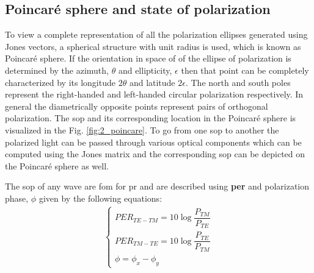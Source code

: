 \documentclass[../report.tex]{subfiles}
\begin{document}
		\subsection{Poincaré sphere and state of polarization} \label{concept:poincare_sphare}
To view a complete representation of all the polarization ellipses generated using Jones vectors, a spherical structure with unit radius is used, which is known as Poincaré sphere. If the orientation in space of of the ellipse of polarization is determined by the azimuth, $\theta$ and ellipticity, $\epsilon$ then that point can be completely characterized by its longitude $2\theta$ and latitude $2\epsilon$. The north and south poles represent the right-handed and left-handed circular polarization respectively. In general the diametrically opposite points represent pairs of orthogonal polarization. The \gls{sop} and its corresponding location in the Poincaré sphere is visualized in the Fig. \ref{fig:2_poincare}. To go from one \gls{sop} to another the polarized light can be passed through various optical components which can be computed using the Jones matrix and the corresponding \gls{sop} can be depicted on the Poincaré sphere as well. 
\par The \gls{sop} of any wave are \gls{fom} for \gls{pr} and are described using \textbf{\gls{per}} and polarization phase, $\phi$ given by the following equations:
\begin{equation}\label{eq:wave_sop}
\begin{aligned}
\begin{cases}
PER_{TE-TM} = 10\log \dfrac {P_{TM}} {P_{TE}}\\
PER_{TM-TE} = 10\log \dfrac {P_{TE}} {P_{TM}}\\
\phi =\phi _{x}-\phi _{y}
\end{cases}
\end{aligned}
\end{equation}
     
\end{document}

